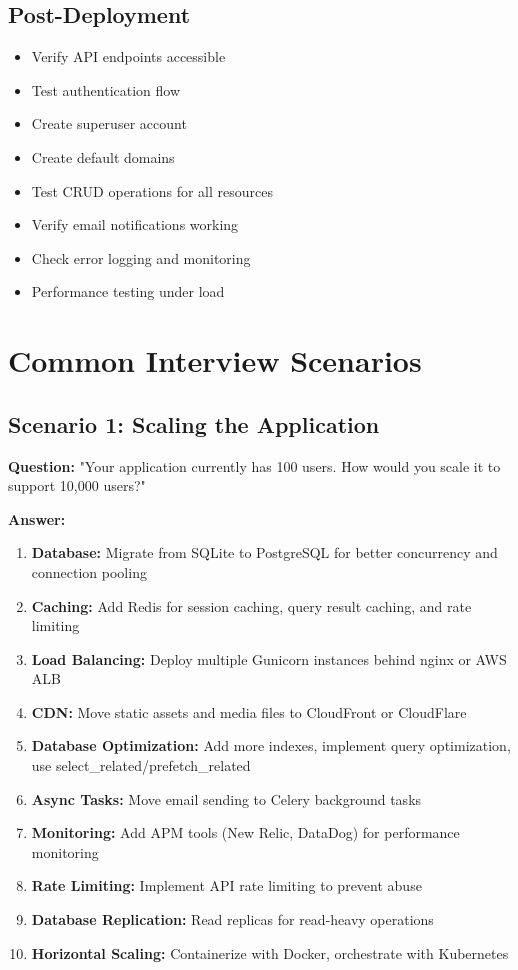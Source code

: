 \documentclass[11pt,a4paper]{article}
\begin{document}
\subsection{Post-Deployment}
\begin{itemize}[leftmargin=*]
    \item[$\square$] Verify API endpoints accessible
    \item[$\square$] Test authentication flow
    \item[$\square$] Create superuser account
    \item[$\square$] Create default domains
    \item[$\square$] Test CRUD operations for all resources
    \item[$\square$] Verify email notifications working
    \item[$\square$] Check error logging and monitoring
    \item[$\square$] Performance testing under load
\end{itemize}

\section{Common Interview Scenarios}

\subsection{Scenario 1: Scaling the Application}
\textbf{Question:} "Your application currently has 100 users. How would you scale it to support 10,000 users?"

\textbf{Answer:}
\begin{enumerate}[leftmargin=*]
    \item \textbf{Database:} Migrate from SQLite to PostgreSQL for better concurrency and connection pooling
    \item \textbf{Caching:} Add Redis for session caching, query result caching, and rate limiting
    \item \textbf{Load Balancing:} Deploy multiple Gunicorn instances behind nginx or AWS ALB
    \item \textbf{CDN:} Move static assets and media files to CloudFront or CloudFlare
    \item \textbf{Database Optimization:} Add more indexes, implement query optimization, use select\_related/prefetch\_related
    \item \textbf{Async Tasks:} Move email sending to Celery background tasks
    \item \textbf{Monitoring:} Add APM tools (New Relic, DataDog) for performance monitoring
    \item \textbf{Rate Limiting:} Implement API rate limiting to prevent abuse
    \item \textbf{Database Replication:} Read replicas for read-heavy operations
    \item \textbf{Horizontal Scaling:} Containerize with Docker, orchestrate with Kubernetes
\end{enumerate}
\end{document}
